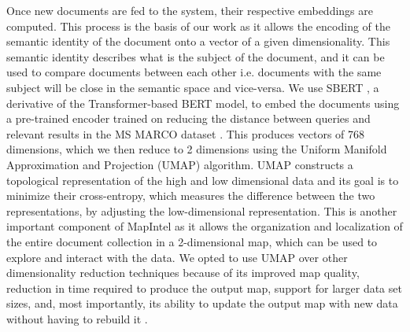 \documentclass[a4paper]{article}
\begin{document}
Once new documents are fed to the system, their respective embeddings are computed. This process is the basis of our work as it allows the encoding of the semantic identity of the document onto a vector of a given dimensionality. This semantic identity describes what is the subject of the document, and it can be used to compare documents between each other i.e. documents with the same subject will be close in the semantic space and vice-versa. We use SBERT \citep{reimers2019}, a derivative of the Transformer-based BERT model, to embed the documents using a pre-trained encoder trained on reducing the distance between queries and relevant results in the MS MARCO dataset \citep{bajaj2018}. This produces vectors of 768 dimensions, which we then reduce to 2 dimensions using the Uniform Manifold Approximation and Projection (UMAP) \citep{mcinnes2020} algorithm. UMAP constructs a topological representation of the high and low dimensional data and its goal is to minimize their cross-entropy, which measures the difference between the two representations, by adjusting the low-dimensional representation. This is another important component of MapIntel as it allows the organization and localization of the entire document collection in a 2-dimensional map, which can be used to explore and interact with the data. We opted to use UMAP over other dimensionality reduction techniques because of its improved map quality, reduction in time required to produce the output map, support for larger data set sizes, and, most importantly, its ability to update the output map with new data without having to rebuild it \citep{mcinnes2020}.
\end{document}
